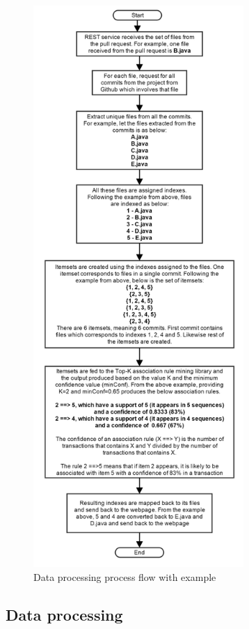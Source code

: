 \begin{figure}[ht!]
\includegraphics[width=8cm]{data_processing_spmf}
\caption{Data processing process flow with example}
\label{fig:data_processing_spmf}
\end{figure}

\subsection{Data processing}
\label{sec:dataprocessing}

